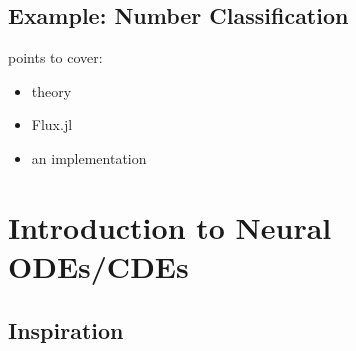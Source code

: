\documentclass[a4paper,11pt, titlepage]{article}
\theoremstyle{definition}
\theoremstyle{plain}
\theoremstyle{remark}
\begin{document}
\subsection{Example: Number Classification}
points to cover:
\begin{itemize}
    \item theory
    \item Flux.jl
    \item an implementation
\end{itemize}

\section{Introduction to Neural ODEs/CDEs}

\subsection{Inspiration}
\end{document}
